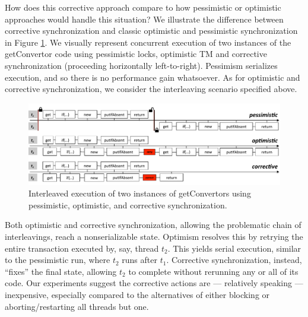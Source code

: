 How does this corrective approach compare to how pessimistic or optimistic approaches would handle this situation?
%
We illustrate the difference between corrective synchronization and classic optimistic and pessimistic synchronization in Figure \ref{Fi:motivatingOverview}. We visually represent concurrent execution of two instances of the \textsf{getConvertor} code using pessimistic locks, optimistic TM and corrective synchronization (proceeding horizontally left-to-right). Pessimism serializes execution, and so there is no performance gain whatsoever. As for optimistic and corrective synchronization, we consider the interleaving scenario specified above. %
%
\begin{figure}[t]
	\begin{center}
	\includegraphics[width=\textwidth]{OverviewSlide.pdf}
	\end{center}
	\vspace{-0.6cm}\caption{\label{Fi:motivatingOverview}Interleaved execution of two instances of \textsf{getConvertors} using pessimistic, optimistic, and corrective synchronization.}
\end{figure}
%
Both optimistic and corrective synchronization, allowing the problematic chain of interleavings, reach a nonserializable state. Optimism resolves this by retrying the entire transaction executed by, say, thread $t_2$. This yields serial execution, similar to the pessimistic run, where $t_2$ runs after $t_1$. Corrective synchronization, instead, ``fixes'' the final state, allowing $t_2$ to complete without rerunning any or all of its code.
%
Our experiments suggest the corrective actions are --- relatively speaking --- inexpensive, especially compared to the alternatives of either blocking or aborting/restarting all threads but one.


